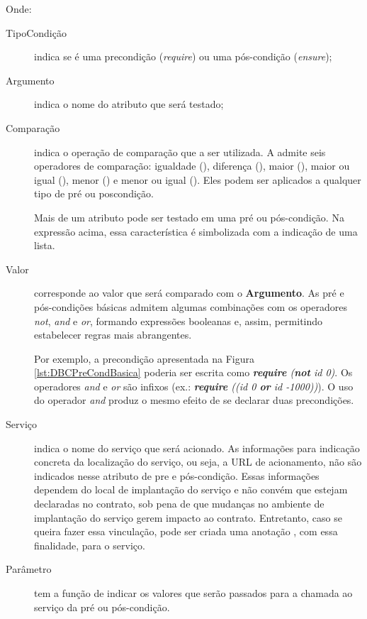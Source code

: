 Onde:
\vspace{-6mm}
\begin{description}
\item [TipoCondição] indica se é uma precondição (\emph{require}) ou uma
pós-condição (\emph{ensure});

\item [Argumento] indica o nome do atributo que será testado;

\item [Comparação] indica o operação de comparação que a ser utilizada. A
\neoidl{}  admite seis operadores de comparação: igualdade (\literal{==}), 
diferença (\literal{<>}), maior (\literal{>}), maior ou igual (\literal{>=}), 
menor (\literal{<}) e menor ou igual (\literal{<=}). Eles podem ser aplicados  a
qualquer tipo de pré ou poscondição.

Mais de um atributo pode ser testado em uma pré ou pós-condição. Na expressão
acima, essa característica é simbolizada com a indicação de uma lista.

\item [Valor] corresponde ao valor que será comparado com o \textbf{Argumento}.
As pré e pós-condições básicas admitem algumas combinações com os operadores
\emph{not}, \emph{and} e \emph{or}, formando expressões booleanas e,
assim, permitindo estabelecer regras mais abrangentes.

Por exemplo, a precondição apresentada na Figura \ref{lst:DBCPreCondBasica} poderia
ser escrita como \emph{\textbf{require} (\textbf{not} id \literal{<=} 0)}. Os
operadores \emph{and} e \emph{or} são infixos (ex.: \emph{\textbf{require}
((id \literal{>} 0 \textbf{or} id \literal{<=} -1000))}). O uso do operador
\emph{and} produz o mesmo efeito de se declarar duas precondições.

\item [Serviço] indica o nome do serviço que será acionado. As informações para
indicação concreta da localização do serviço, ou seja, a URL de acionamento, não
são indicados nesse atributo de pre e pós-condição. Essas informações dependem
do local de implantação do serviço e não convém que estejam declaradas no
contrato, sob pena de que mudanças no ambiente de implantação do serviço gerem
impacto ao contrato.
Entretanto, caso se queira fazer essa vinculação, pode ser criada uma anotação
\neoidl{}, com essa finalidade, para o serviço.

\item [Parâmetro] tem a função de indicar os valores que serão passados para a
chamada ao serviço da pré ou pós-condição.


\end{description}

